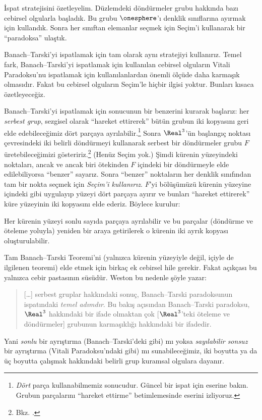 \documentclass[../../../include/open-logic-section]{subfiles}
\begin{document}
İspat stratejisini özetleyelim. Düzlemdeki döndürmeler grubu hakkında bazı
cebirsel olgularla başladık. Bu grubu $\onesphere$'ı denklik sınıflarına
ayırmak için kullandık. Sonra her sınıftan elemanlar seçmek için Seçim'i
kullanarak bir ``paradoksa'' ulaştık.

Banach--Tarski'yi ispatlamak için tam olarak aynı stratejiyi kullanırız.
Temel fark, Banach--Tarski'yi ispatlamak için kullanılan cebirsel olguların
Vitali Paradoksu'nu ispatlamak için kullanılanlardan önemli ölçüde daha
karmaşık olmasıdır. Fakat bu cebirsel olguların Seçim'le hiçbir ilgisi
yoktur. Bunları kısaca özetleyeceğiz.

Banach--Tarski'yi ispatlamak için  sonucunun bir
benzerini kurarak başlarız: her \emph{serbest grup}, sezgisel olarak
``hareket ettirerek'' bütün grubun iki kopyasını geri elde edebileceğimiz
dört parçaya ayrılabilir.\footnote{\emph{Dört} parça kullanabilmemiz
\cite{Robinson1947} sonucudur. Güncel bir ispat için
\citet[Theorem 5.2]{Wagon2016} eserine bakın. Grubun parçalarını
``hareket ettirme'' betimlemesinde \citet[p.~3]{Weston2003} eserini
izliyoruz.} Sonra $\Real^3$'ün başlangıç noktası çevresindeki iki belirli
döndürmeyi kullanarak serbest bir döndürmeler grubu $F$ üretebileceğimizi
gösteririz.\footnote{Bkz. \citet[Theorem 2.1]{Wagon2016}.} (Henüz Seçim
yok.) Şimdi kürenin yüzeyindeki noktaları, ancak ve ancak biri ötekinden
$F$ içindeki bir döndürmeyle elde edilebiliyorsa ``benzer'' sayarız. Sonra
``benzer'' noktaların her denklik sınıfından tam bir nokta seçmek için
\emph{Seçim'i kullanırız}. $F$'yi bölüşümüzü kürenin yüzeyine
 içindeki gibi uygulayıp yüzeyi dört parçaya
ayırır ve bunları ``hareket ettirerek'' küre yüzeyinin iki kopyasını elde
ederiz. Böylece \citep{Hausdorff1914} kurulur:

\begin{thm}
Her kürenin yüzeyi sonlu sayıda parçaya ayrılabilir ve bu parçalar
(döndürme ve öteleme yoluyla) yeniden bir araya getirilerek o kürenin iki
ayrık kopyası oluşturulabilir.
\end{thm}

Tam Banach--Tarski Teoremi'ni (yalnızca kürenin yüzeyiyle değil, içiyle de
ilgilenen teoremi) elde etmek için birkaç ek cebirsel hile gerekir. Fakat
açıkçası bu yalnızca cebir pastasının süsüdür. Weston bu nedenle şöyle
yazar:
\begin{quote}
  [\ldots] serbest gruplar hakkındaki sonuç, Banach--Tarski paradoksunun
  ispatındaki \emph{temel adımdır}. Bu bakış açısından Banach--Tarski
  paradoksu, $\Real^3$ hakkındaki bir ifade olmaktan çok [$\Real^3$'teki
  öteleme ve döndürmeler] grubunun karmaşıklığı hakkındaki bir ifadedir.
  \cite[p.~16]{Weston2003}
\end{quote}
Yani \emph{sonlu} bir ayrıştırma (Banach--Tarski'deki gibi) mı yoksa
\emph{sayılabilir sonsuz} bir ayrıştırma (Vitali Paradoksu'ndaki gibi) mı
sunabileceğimiz, iki boyutta ya da üç boyutta çalışmak hakkındaki belirli
grup kuramsal olgulara dayanır.
\end{document}
